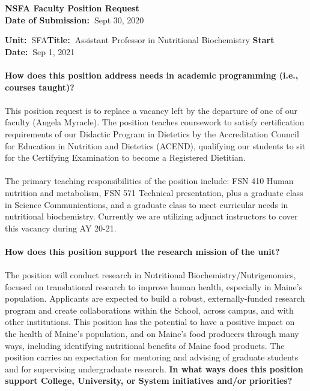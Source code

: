 \documentclass[11pt]{article}
\begin{document}
\sloppy \rmfamily
\begin{center}\textbf{NSFA Faculty Position Request\\Date of Submission:~}Sept 30, 2020\end{center}

\noindent\textbf{Unit:~}SFA\hfill\textbf{Title:~}Assistant Professor in Nutritional Biochemistry \hfill \textbf{Start Date:~}Sep 1, 2021\\~\\
\textbf{How does this position address needs in academic programming (i.e., courses taught)?}\\~\\
\small\sffamily 
This position request is to replace a vacancy left by the departure of one of our faculty (Angela Myracle). The position teaches coursework to satisfy certification requirements of our Didactic Program in Dietetics by the Accreditation Council for Education in Nutrition and Dietetics (ACEND), qualifying our students to sit for the Certifying Examination to become a Registered Dietitian.\\~\\
The primary teaching responsibilities of the position include: FSN 410 Human nutrition and metabolism, FSN 571 Technical presentation, plus a graduate class in Science Communications, and a graduate class to meet curricular needs in nutritional biochemistry. Currently we are utilizing adjunct instructors to cover this vacancy during AY 20-21. \\~\\
\textbf{\rmfamily How does this position support the research mission of the unit?}\\~\\
The position will conduct research in Nutritional Biochemistry/Nutrigenomics, focused on translational research to improve human health, especially in Maine's population. Applicants are expected to build a robust, externally-funded research program and create collaborations within the School, across campus, and with other institutions. This position has the potential to have a positive impact on the health of Maine's population, and on Maine's food producers through many ways, including identifying  nutritional benefits of Maine food products. The position carries an expectation for mentoring and advising of graduate students and for supervising undergraduate research. 
\newpage
\noindent\textbf{\rmfamily In what ways does this position support College, University, or System initiatives and/or priorities?}
\\~\\
\end{document}
